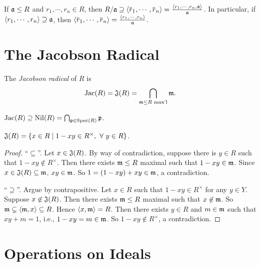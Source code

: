 \begin{fact*}
    If $\mathfrak{a} \leq R$ and $r_1,\cdots,r_n \in R$, then $R/\ffa \supseteq \langle \overbar r_1,\cdots,\overbar r_n \rangle = \frac{\langle r_1,\cdots,r_n, \ffa \rangle}{\ffa}$. In particular, if $\langle r_1,\cdots,r_n \rangle \supseteq \mathfrak{a}$, then $\langle \overbar r_1, \cdots, \overbar r_n \rangle = \frac{\langle r_1,\cdots,r_n \rangle}{\ffa}$.
\end{fact*}

\section*{The Jacobson Radical}

\begin{definition}\label{1.27}
    The \emph{Jacobson radical} of $R$ is 
    \[\operatorname{Jac}(R) = \mathfrak{J}(R) = \bigcap_{\mathfrak{m} \leq R \text{ max'l}}\mathfrak{m}.\]
\end{definition}

\begin{fact}\label{1.28}
    $\operatorname{Jac}(R) \supseteq \operatorname{Nil}(R) = \bigcap_{\mathfrak{p} \in \operatorname{Spec}(R)}\mathfrak{p}$.
\end{fact}

\begin{proposition}\label{1.29}
    $\mathfrak{J}(R) = \{x \in R \mid 1-xy \in R^\times, \ \forall \  y \in R\}$.
\end{proposition}

\begin{proof}
    ``$\subseteq$''. Let $x \in \mathfrak{J}(R)$. By way of contradiction, suppose there is $y \in R$ such that $1-xy \not \in R^\times$. Then there exists $\mathfrak{m} \leq R$ maximal such that $1-xy \in \mathfrak{m}$. Since $x \in \mathfrak{J}(R) \subseteq \mathfrak{m}$, $xy \in \mathfrak{m}$. So $1 = (1-xy) + xy \in \mathfrak{m}$, a contradiction. \par
    ``$\supseteq$''. Argue by contrapositive. Let $x \in R$ such that $1-xy \in R^\times$ for any $y \in Y$. Suppose $x \not \in \mathfrak{J}(R)$. Then there exists $\mathfrak{m} \leq R$ maximal such that $x \not \in \mathfrak{m}$. So $\mathfrak{m} \subsetneq \langle \mathfrak{m}, x \rangle \subseteq R$. Hence $\langle x,\mathfrak{m} \rangle = R$. Then there exists $y \in R$ and $m \in \mathfrak{m}$ such that $xy+m = 1$, i.e., $1-xy = m \in \mathfrak{m}$. So $1-xy \not \in R^\times$, a contradiction.
\end{proof}

\section*{Operations on Ideals}

